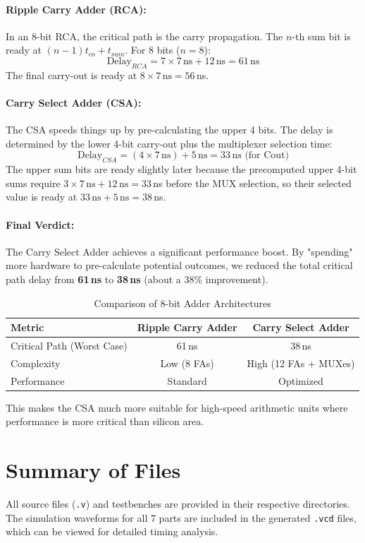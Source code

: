 \documentclass[a4paper,12pt]{article}
\begin{document}
\paragraph{Ripple Carry Adder (RCA):}
In an 8-bit RCA, the critical path is the carry propagation. The $n$-th sum bit is ready at $(n-1)t_{co} + t_{sum}$. For 8 bits ($n=8$):
\[ \text{Delay}_{RCA} = 7 \times 7\,\text{ns} + 12\,\text{ns} = 61\,\text{ns} \]
The final carry-out is ready at $8 \times 7\,\text{ns} = 56$\,ns.

\paragraph{Carry Select Adder (CSA):}
The CSA speeds things up by pre-calculating the upper 4 bits. The delay is determined by the lower 4-bit carry-out plus the multiplexer selection time:
\[ \text{Delay}_{CSA} = (4 \times 7\,\text{ns}) + 5\,\text{ns} = 33\,\text{ns} \text{ (for Cout)} \]
The upper sum bits are ready slightly later because the precomputed upper 4-bit sums require $3 \times 7\,\text{ns} + 12\,\text{ns} = 33$\,ns before the MUX selection, so their selected value is ready at $33\,\text{ns} + 5\,\text{ns} = 38$\,ns.

\paragraph{Final Verdict:}
The Carry Select Adder achieves a significant performance boost. By "spending" more hardware to pre-calculate potential outcomes, we reduced the total critical path delay from \textbf{61\,ns} to \textbf{38\,ns} (about a 38\% improvement).

\begin{table}[h]
\centering
\begin{tabular}{|l|c|c|}
\hline
\textbf{Metric} & \textbf{Ripple Carry Adder} & \textbf{Carry Select Adder} \\ \hline
Critical Path (Worst Case) & 61\,ns & 38\,ns \\ \hline
Complexity & Low (8 FAs) & High (12 FAs + MUXes) \\ \hline
Performance & Standard & Optimized \\ \hline
\end{tabular}
\caption{Comparison of 8-bit Adder Architectures}
\end{table}

This makes the CSA much more suitable for high-speed arithmetic units where performance is more critical than silicon area.

\section{Summary of Files}
All source files (\texttt{.v}) and testbenches are provided in their respective directories. The simulation waveforms for all 7 parts are included in the generated \texttt{.vcd} files, which can be viewed for detailed timing analysis.
\end{document}
